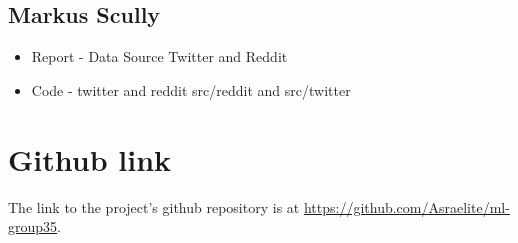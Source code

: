 \documentclass[transmag]{IEEEtran}
\begin{document}
\subsection{Markus Scully}
\begin{itemize}
  \item Report - Data Source Twitter and Reddit
  \item Code - twitter and reddit src/reddit and src/twitter
\end{itemize}

\section{Github link}
\noindent The link to the project's github repository is at \url{https://github.com/Asraelite/ml-group35}.








\end{document}
